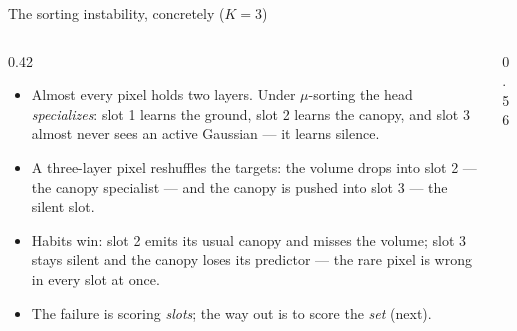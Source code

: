 \begin{frame}{The sorting instability, concretely ($K{=}3$)}
  \small
  \begin{columns}[c]
    \begin{column}{0.42\textwidth}
      \footnotesize
      \begin{itemize}
        \setlength{\itemsep}{10pt}
        \item Almost every pixel holds two layers. Under $\mu$-sorting the head
              \emph{specializes}: slot 1 learns the ground, slot 2 learns the canopy,
              and slot 3 almost never sees an active Gaussian --- it learns silence.
        \item A three-layer pixel reshuffles the targets: the volume drops into
              slot 2 --- the canopy specialist --- and the canopy is pushed into
              slot 3 --- the silent slot.
        \item Habits win: slot 2 emits its usual canopy and misses the volume;
              slot 3 stays silent and the canopy loses its predictor --- the rare
              pixel is wrong in every slot at once.
        \item The failure is scoring \emph{slots}; the way out is to score the
              \emph{set} (next).
      \end{itemize}
    \end{column}
    \begin{column}{0.56\textwidth}
      \centering
\end{column}
\end{columns}
\end{frame}

